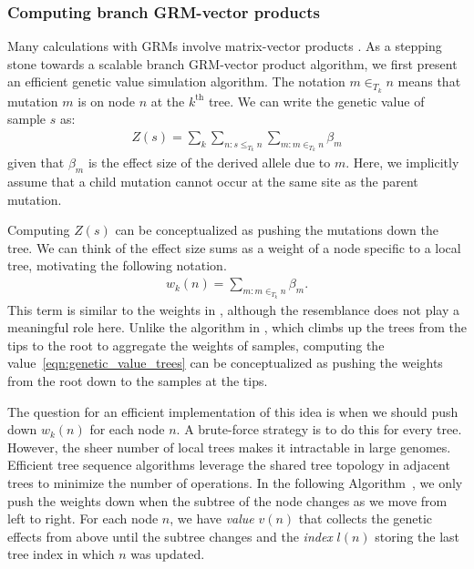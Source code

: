 \subsubsection{Computing branch GRM-vector products}
Many calculations with GRMs involve matrix-vector products
\citep{colleau2002indirect, colleau2017fast}.
%
As a stepping stone towards a scalable branch GRM-vector product algorithm,
we first present an efficient genetic value simulation algorithm.
%
The notation $m \in_{T_k} n$ means that mutation $m$ is on node $n$ at the $k^{\text{th}}$ tree.
%
We can write the genetic value of sample $s$ as:
%
\begin{align} \label{eqn:genetic_value_trees}
    Z(s) = \sum_k \sum_{n: s\le_{T_k} n} \sum_{m:m \in_{T_k} n} \beta_m
\end{align}
%
given that $\beta_m$ is the effect size of the derived allele due to $m$.
%
Here, we implicitly assume that a child mutation cannot occur at the same site as the parent mutation.

Computing $Z(s)$ can be conceptualized as pushing the mutations down the tree.
%
We can think of the effect size sums as a weight of a node specific to a local tree,
motivating the following notation.
%
\begin{align}
    w_k(n) = \sum_{m: m \in_{T_k} n} \beta_m .
\end{align}
%
This term is similar to the weights in \citet{ralph2020efficiently},
although the resemblance does not play a meaningful role here.
%
Unlike the algorithm in \citet{ralph2020efficiently},
which climbs up the trees from the tips to the root to aggregate the weights of samples,
computing the value~\eqref{eqn:genetic_value_trees} can be conceptualized as
pushing the weights from the root down to the samples at the tips.

The question for an efficient implementation of this idea
is when we should push down $w_k(n)$ for each node $n$.
%
A brute-force strategy is to do this for every tree.
%
However, the sheer number of local trees makes it intractable in large genomes.
%
Efficient tree sequence algorithms leverage the shared tree topology
in adjacent trees to minimize the number of operations.
%
In the following Algorithm~,
we only push the weights down when the subtree of the node changes
as we move from left to right.
%
For each node $n$, we have \textit{value} $v(n)$ that collects the genetic effects from above until the subtree changes and
the \textit{index} $l(n)$ storing the last tree index in which $n$ was updated.

